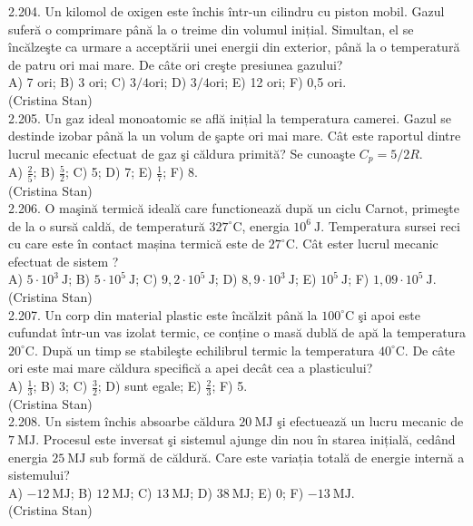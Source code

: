 2.204. Un kilomol de oxigen este închis într-un cilindru cu piston mobil. Gazul suferă o comprimare până la o treime din volumul inițial. Simultan, el se încălzeşte ca urmare a acceptării unei energii din exterior, până la o temperatură de patru ori mai mare. De câte ori creşte presiunea gazului?\\ A) 7 ori; B) 3 ori; C) $3 / 4 \mathrm{ori}$; D) $3 / 4 \mathrm{ori}$; E) 12 ori; F) 0,5 ori.\\ (Cristina Stan)\\

2.205. Un gaz ideal monoatomic se află inițial la temperatura camerei. Gazul se destinde izobar până la un volum de şapte ori mai mare. Cât este raportul dintre lucrul mecanic efectuat de gaz şi căldura primită? Se cunoaşte $C_{p}=5 / 2 R$.\\ A) $\frac{2}{5}$; B) $\frac{5}{2}$; C) 5; D) 7; E) $\frac{1}{7}$; F) 8.\\ (Cristina Stan)\\

2.206. O maşină termică ideală care functionează după un ciclu Carnot, primeşte de la o sursă caldă, de temperatură $327^{\circ} \mathrm{C}$, energia $10^{6} \mathrm{~J}$. Temperatura sursei reci cu care este în contact mașina termică este de $27^{\circ} \mathrm{C}$. Cât ester lucrul mecanic efectuat de sistem ?\\ A) $5 \cdot 10^{3} \mathrm{~J}$; B) $5 \cdot 10^{5} \mathrm{~J}$; C) $9,2 \cdot 10^{5} \mathrm{~J}$; D) $8,9 \cdot 10^{3} \mathrm{~J}$; E) $10^{5} \mathrm{~J}$; F) $1,09 \cdot 10^{5} \mathrm{~J}$.\\ (Cristina Stan)\\

2.207. Un corp din material plastic este încălzit până la $100^{\circ} \mathrm{C}$ şi apoi este cufundat într-un vas izolat termic, ce conține o masă dublă de apă la temperatura $20^{\circ} \mathrm{C}$. După un timp se stabileşte echilibrul termic la temperatura $40^{\circ} \mathrm{C}$. De câte ori este mai mare căldura specifică a apei decât cea a plasticului?\\ A) $\frac{1}{3}$; B) 3; C) $\frac{3}{2}$; D) sunt egale; E) $\frac{2}{3}$; F) 5.\\ (Cristina Stan)\\

2.208. Un sistem închis absoarbe căldura $20 \mathrm{~MJ}$ şi efectuează un lucru mecanic de $7 \mathrm{~MJ}$. Procesul este inversat şi sistemul ajunge din nou în starea inițială, cedând energia $25 \mathrm{~MJ}$ sub formă de căldură. Care este variația totală de energie internă a sistemului?\\ A) $-12 \mathrm{~MJ}$; B) $12 \mathrm{~MJ}$; C) $13 \mathrm{~MJ}$; D) $38 \mathrm{~MJ}$; E) 0; F) $-13 \mathrm{~MJ}$.\\ (Cristina Stan)\\

